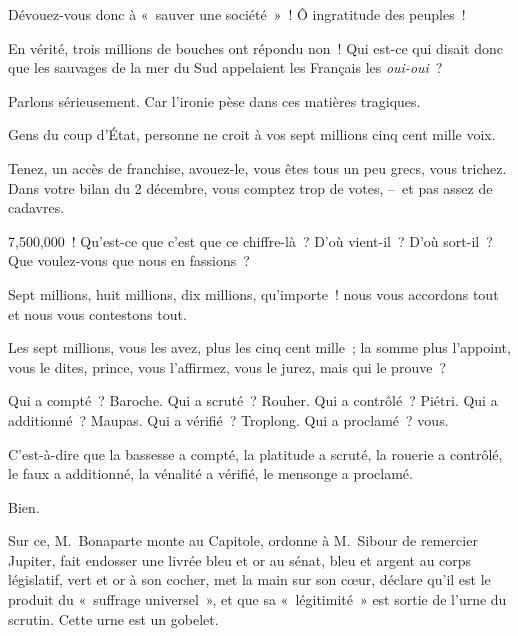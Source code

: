 \documentclass[french,twoside]{book} %
\begin{document}
Dévouez-vous donc à « sauver une société » ! Ô ingratitude des peuples !\par
En vérité, trois millions de bouches ont répondu non ! Qui est-ce qui disait donc que les sauvages de la mer du Sud appelaient les Français les \emph{oui-oui} ?\par
Parlons sérieusement. Car l’ironie pèse dans ces matières tragiques.\par
Gens du coup d’État, personne ne croit à vos sept millions cinq cent mille voix.\par
Tenez, un accès de franchise, avouez-le, vous êtes tous un peu grecs, vous trichez. Dans votre bilan du 2 décembre, vous comptez trop de votes, – et pas assez de cadavres.\par
7,500,000 ! Qu’est-ce que c’est que ce chiffre-là ? D’où vient-il ? D’où sort-il ? Que voulez-vous que nous en fassions ?\par
Sept millions, huit millions, dix millions, qu’importe ! nous vous accordons tout et nous vous contestons tout.\par
Les sept millions, vous les avez, plus les cinq cent mille ; la somme plus l’appoint, vous le dites, prince, vous l’affirmez, vous le jurez, mais qui le prouve ?\par
Qui a compté ? Baroche. Qui a scruté ? Rouher. Qui a contrôlé ? Piétri. Qui a additionné ? Maupas. Qui a vérifié ? Troplong. Qui a proclamé ? vous.\par
C’est-à-dire que la bassesse a compté, la platitude a scruté, la rouerie a contrôlé, le faux a additionné, la vénalité a vérifié, le mensonge a proclamé.\par
Bien.\par
Sur ce, M. Bonaparte monte au Capitole, ordonne à M. Sibour de remercier Jupiter, fait endosser une livrée bleu et or au sénat, bleu et argent au corps législatif, vert et or à son cocher, met la main sur son cœur, déclare qu’il est le produit du « suffrage universel », et que sa « légitimité » est sortie de l’urne du scrutin. Cette urne est un gobelet.
\end{document}
